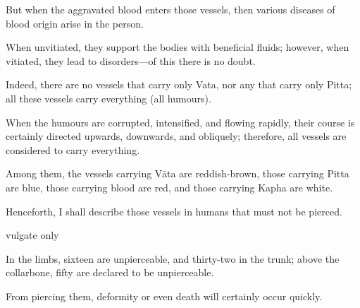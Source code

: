 \begin{translation}
\begin{tt}
\item[15]
But when the aggravated blood enters those vessels, then various diseases of blood origin arise in the person.

\item[15.1]
When unvitiated, they support the bodies with beneficial fluids; however, when vitiated, they lead to disorders—of this there is no doubt.

\item[16]
Indeed, there are no vessels that carry only Vata, nor any that carry only Pitta; all these vessels carry everything (all humours).

\item[17]
When the humours are corrupted, intensified, and flowing rapidly, their course is certainly directed upwards, downwards, and obliquely; therefore, all vessels are considered to carry everything. 

\item[18]
Among them, the vessels carrying Vāta are reddish-brown, those carrying Pitta are blue, those carrying blood are red, and those carrying Kapha are white.

\item[19]
Henceforth, I shall describe those vessels in humans that must not be pierced.

\item[20]  vulgate only

\item[21]
In the limbs, sixteen are unpierceable, and thirty-two in the trunk; above the collarbone, fifty are declared to be unpierceable.

\item[19cd]
From piercing them, deformity or even death will certainly occur quickly.


\end{tt}
\end{translation}

